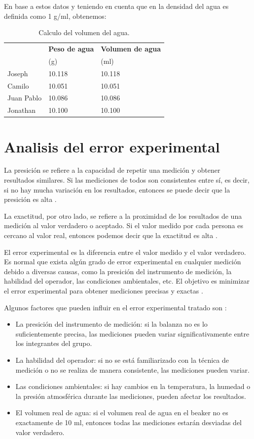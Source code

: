 \documentclass[letterpaper]{IEEEconf}
\begin{document}
En base a estos datos y teniendo en cuenta que en \cite{atares} la densidad del agua es definida como 1 g/ml,  obtenemos:

\begin{table}[H]
\centering
\begin{tabular}{|p{2cm}|p{2cm}|p{2cm}|}
\hline
 & \bfseries Peso de agua & \bfseries Volumen de agua \\
 & (g) & (ml) \\
\hline
Joseph & 10.118 & 10.118 \\
\hline
Camilo & 10.051 & 10.051 \\
\hline
Juan Pablo & 10.086 & 10.086 \\
\hline
Jonathan & 10.100 & 10.100 \\
\hline
\end{tabular}
\caption{Calculo del volumen del agua.}
\label{tab:volumen}
\end{table}

\section{Analisis del error experimental}

La presición se refiere a la capacidad de repetir una medición y obtener resultados similares. Si las mediciones de todos son consistentes entre sí, es decir, si no hay mucha variación en los resultados, entonces se puede decir que la presición es alta \cite{Brynn2010}.

La exactitud, por otro lado, se refiere a la proximidad de los resultados de una medición al valor verdadero o aceptado. Si el valor medido por cada persona es cercano al valor real, entonces podemos decir que la exactitud es alta \cite{Brynn2010}.

El error experimental es la diferencia entre el valor medido y el valor verdadero. Es normal que exista algún grado de error experimental en cualquier medición debido a diversas causas, como la presición del instrumento de medición, la habilidad del operador, las condiciones ambientales, etc. El objetivo es minimizar el error experimental para obtener mediciones precisas y exactas \cite{Brynn2010}.

Algunos factores que pueden influir en el error experimental tratado son \cite{Taylor1997, Rogers2012}:

\begin{itemize}
\item La presición del instrumento de medición: si la balanza no es lo suficientemente precisa, las mediciones pueden variar significativamente entre los integrantes del grupo.
\item La habilidad del operador: si no se está familiarizado con la técnica de medición o no se realiza de manera consistente, las mediciones pueden variar.
\item Las condiciones ambientales: si hay cambios en la temperatura, la humedad o la presión atmosférica durante las mediciones, pueden afectar los resultados.
\item El volumen real de agua: si el volumen real de agua en el beaker no es exactamente de 10 ml, entonces todas las mediciones estarán desviadas del valor verdadero.
\end{itemize}
\end{document}
